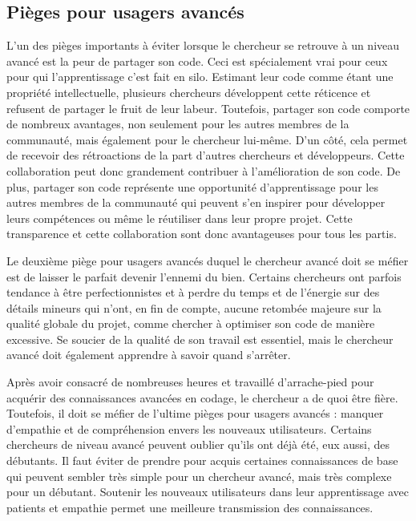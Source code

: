 \documentclass[
  letterpaper,
]{scrbook}
\begin{document}
\hypertarget{piuxe8ges-pour-usagers-avancuxe9s}{%
\subsection{Pièges pour usagers
avancés}\label{piuxe8ges-pour-usagers-avancuxe9s}}

L'un des pièges importants à éviter lorsque le chercheur se retrouve à
un niveau avancé est la peur de partager son code. Ceci est spécialement
vrai pour ceux pour qui l'apprentissage c'est fait en silo. Estimant
leur code comme étant une propriété intellectuelle, plusieurs chercheurs
développent cette réticence et refusent de partager le fruit de leur
labeur. Toutefois, partager son code comporte de nombreux avantages, non
seulement pour les autres membres de la communauté, mais également pour
le chercheur lui-même. D'un côté, cela permet de recevoir des
rétroactions de la part d'autres chercheurs et développeurs. Cette
collaboration peut donc grandement contribuer à l'amélioration de son
code. De plus, partager son code représente une opportunité
d'apprentissage pour les autres membres de la communauté qui peuvent
s'en inspirer pour développer leurs compétences ou même le réutiliser
dans leur propre projet. Cette transparence et cette collaboration sont
donc avantageuses pour tous les partis.

Le deuxième piège pour usagers avancés duquel le chercheur avancé doit
se méfier est de laisser le parfait devenir l'ennemi du bien. Certains
chercheurs ont parfois tendance à être perfectionnistes et à perdre du
temps et de l'énergie sur des détails mineurs qui n'ont, en fin de
compte, aucune retombée majeure sur la qualité globale du projet, comme
chercher à optimiser son code de manière excessive. Se soucier de la
qualité de son travail est essentiel, mais le chercheur avancé doit
également apprendre à savoir quand s'arrêter.

Après avoir consacré de nombreuses heures et travaillé d'arrache-pied
pour acquérir des connaissances avancées en codage, le chercheur a de
quoi être fière. Toutefois, il doit se méfier de l'ultime pièges pour
usagers avancés : manquer d'empathie et de compréhension envers les
nouveaux utilisateurs. Certains chercheurs de niveau avancé peuvent
oublier qu'ils ont déjà été, eux aussi, des débutants. Il faut éviter de
prendre pour acquis certaines connaissances de base qui peuvent sembler
très simple pour un chercheur avancé, mais très complexe pour un
débutant. Soutenir les nouveaux utilisateurs dans leur apprentissage
avec patients et empathie permet une meilleure transmission des
connaissances.
\end{document}
